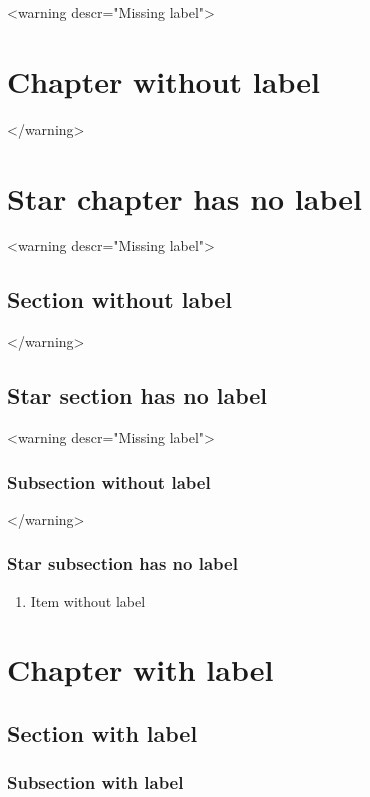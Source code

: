 \documentclass{article}
\begin{document}
    <warning descr="Missing label">\chapter{Chapter without label}</warning>
    \chapter*{Star chapter has no label}
    <warning descr="Missing label">\section{Section without label}</warning>
    \section*{Star section has no label}
    <warning descr="Missing label">\subsection{Subsection without label}</warning>
    \subsection*{Star subsection has no label}
    \begin{enumerate}
        \item Item without label
    \end{enumerate}
    \chapter{Chapter with label}
    \label{ch:chapter-label}
    \section{Section with label}
    \label{sec:section-label}
    \subsection{Subsection with label}
    \label{subsec:subsection-label}
\end{document}
